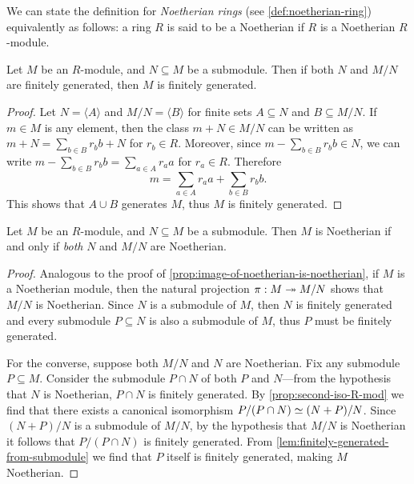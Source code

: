 We can state the definition for \emph{Noetherian rings} (see
\cref{def:noetherian-ring}) equivalently as follows: a ring \(R\) is said to be
a Noetherian if \(R\) is a Noetherian \(R\)-module.

\begin{lemma}
\label{lem:finitely-generated-from-submodule}
Let \(M\) be an \(R\)-module, and \(N \subseteq M\) be a submodule. Then if both
\(N\) and \(M/N\) are finitely generated, then \(M\) is finitely generated.
\end{lemma}

\begin{proof}
Let \(N = \langle A \rangle\) and \(M/N = \langle B \rangle\) for finite sets
\(A \subseteq N\) and \(B \subseteq M/N\). If \(m \in M\) is any element, then
the class \(m + N \in M/N\) can be written as
\(m + N = \sum_{b \in B} r_b b + N\) for \(r_b \in R\). Moreover, since
\(m - \sum_{b \in B} r_b b \in N\), we can write
\(m - \sum_{b \in B} r_b b = \sum_{a \in A} r_a a\) for \(r_a \in R\). Therefore
\[
m = \sum_{a \in A} r_a a + \sum_{b \in B} r_b b.
\]
This shows that \(A \cup B\) generates \(M\), thus \(M\) is finitely generated.
\end{proof}

\begin{proposition}
\label{prop:noetherian-from-submodule}
Let \(M\) be an \(R\)-module, and \(N \subseteq M\) be a submodule. Then \(M\)
is Noetherian if and only if \emph{both} \(N\) and \(M/N\) are Noetherian.
\end{proposition}

\begin{proof}
Analogous to the proof of \cref{prop:image-of-noetherian-is-noetherian}, if
\(M\) is a Noetherian module, then the natural projection \(\pi: M \twoheadrightarrow M/N\)
shows that \(M/N\) is Noetherian. Since \(N\) is a submodule of \(M\), then
\(N\) is finitely generated and every submodule \(P \subseteq N\) is also a
submodule of \(M\), thus \(P\) must be finitely generated.

For the converse, suppose both \(M/N\) and \(N\) are Noetherian. Fix any
submodule \(P \subseteq M\). Consider the submodule \(P \cap N\) of both \(P\)
and \(N\)---from the hypothesis that \(N\) is Noetherian, \(P \cap N\) is
finitely generated. By \cref{prop:second-iso-R-mod} we find that there exists a
canonical isomorphism \(P/(P \cap N) \simeq (N + P)/N\). Since
\((N + P)/N\) is a submodule of \(M/N\), by the hypothesis that \(M/N\) is
Noetherian it follows that \(P/(P \cap N)\) is finitely generated. From
\cref{lem:finitely-generated-from-submodule} we find that \(P\) itself is
finitely generated, making \(M\) Noetherian.
\end{proof}

